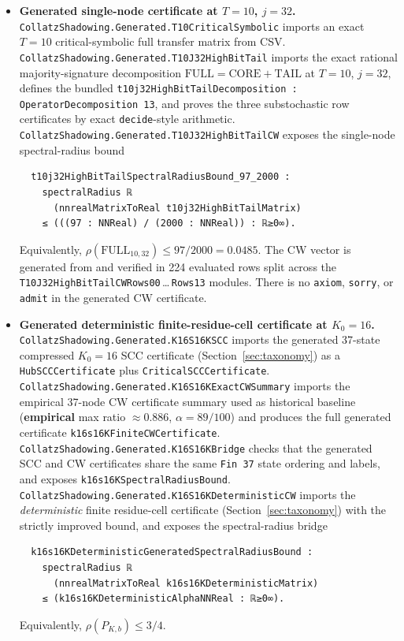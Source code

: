 \documentclass[11pt,a4paper]{article}
\newcommand{\ttbr}[1]{\texttt{\seqsplit{#1}}}
\theoremstyle{definition}
\newcommand{\full}{\mathrm{FULL}}
\newcommand{\core}{\mathrm{CORE}}
\newcommand{\tail}{\mathrm{TAIL}}
\newcommand{\spec}{\rho}
\begin{document}
\begin{itemize}
        \texttt{OperatorDecomposition.cwCertificate\_full}, with
        the spectral corollary
        \texttt{OperatorDecomposition.spectralRadius\_le\_full}.
  \item \textbf{Generated single-node certificate at $T = 10$,
        $j = 32$.}
        \texttt{CollatzShadowing.Generated.T10CriticalSymbolic}
        imports an exact $T = 10$ critical-symbolic full transfer
        matrix from CSV.
        \texttt{CollatzShadowing.Generated.T10J32HighBitTail}
        imports the exact rational
        majority-signature decomposition
        $\full = \core + \tail$ at $T = 10$, $j = 32$,
        defines the bundled
        \texttt{t10j32HighBitTailDecomposition :
        OperatorDecomposition 13}, and proves the three
        substochastic row certificates by exact
        \texttt{decide}-style arithmetic.
        \texttt{CollatzShadowing.Generated.T10J32HighBitTailCW}
        exposes the single-node spectral-radius bound
        \begin{verbatim}
  t10j32HighBitTailSpectralRadiusBound_97_2000 :
    spectralRadius ℝ
      (nnrealMatrixToReal t10j32HighBitTailMatrix)
    ≤ (((97 : NNReal) / (2000 : NNReal)) : ℝ≥0∞).
        \end{verbatim}
        Equivalently, $\spec(\full_{10,32}) \le 97/2000 = 0.0485$.
        The CW vector is generated from
        \ttbr{high\_bit\_tail\_edges\_T10\_j32.csv} and verified
        in 224 evaluated rows split across the
        \texttt{T10J32HighBitTailCWRows00}$\,$\ldots$\,$\texttt{Rows13}
        modules. There is no \texttt{axiom},
        \texttt{sorry}, or \texttt{admit} in the generated CW
        certificate.
  \item \textbf{Generated deterministic finite-residue-cell
        certificate at $K_0 = 16$.}
        \texttt{CollatzShadowing.Generated.K16S16KSCC} imports the
        generated 37-state compressed $K_0 = 16$ SCC certificate
        (Section~\ref{sec:taxonomy}) as a
        \texttt{HubSCCCertificate} plus
        \texttt{CriticalSCCCertificate}.
        \texttt{CollatzShadowing.Generated.K16S16KExactCWSummary}
        imports the empirical 37-node CW certificate summary used
        as historical baseline (\textbf{empirical} max ratio
        $\approx 0.886$, $\alpha = 89/100$) and produces the full
        generated certificate
        \texttt{k16s16KFiniteCWCertificate}.
        \texttt{CollatzShadowing.Generated.K16S16KBridge}
        checks that the generated SCC and CW certificates share
        the same \texttt{Fin 37} state ordering and labels, and
        exposes
        \texttt{k16s16KSpectralRadiusBound}.
        \texttt{CollatzShadowing.Generated.K16S16KDeterministicCW}
        imports the \emph{deterministic} finite residue-cell
        certificate (Section~\ref{sec:taxonomy}) with the strictly
        improved bound, and exposes the spectral-radius bridge
        \begin{verbatim}
  k16s16KDeterministicGeneratedSpectralRadiusBound :
    spectralRadius ℝ
      (nnrealMatrixToReal k16s16KDeterministicMatrix)
    ≤ (k16s16KDeterministicAlphaNNReal : ℝ≥0∞).
        \end{verbatim}
        Equivalently, $\spec(P_{K,b}) \le 3/4$.
\end{itemize}
\end{document}

